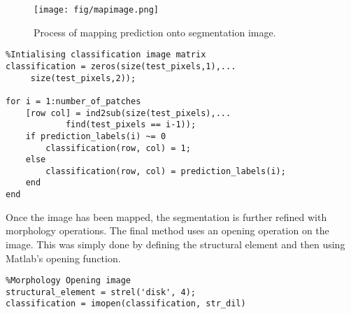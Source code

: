 \begin{figure}[H]
\centering
\texttt{[image: fig/mapimage.png]}
\caption{Process of mapping prediction onto segmentation image.}
\label{fig:mapimage}
\end{figure}

\begin{lstlisting}
%Intialising classification image matrix
classification = zeros(size(test_pixels,1),...
	 size(test_pixels,2));

for i = 1:number_of_patches
    [row col] = ind2sub(size(test_pixels),...
    		find(test_pixels == i-1));
    if prediction_labels(i) ~= 0
        classification(row, col) = 1;
    else
        classification(row, col) = prediction_labels(i);
    end
end
\end{lstlisting}
\bigskip
Once the image has been mapped, the segmentation is further refined with morphology operations. The final method uses an opening operation on the image. This was simply done by defining the structural element and then using Matlab's opening function.

\begin{lstlisting}
%Morphology Opening image
structural_element = strel('disk', 4);
classification = imopen(classification, str_dil)
\end{lstlisting}

